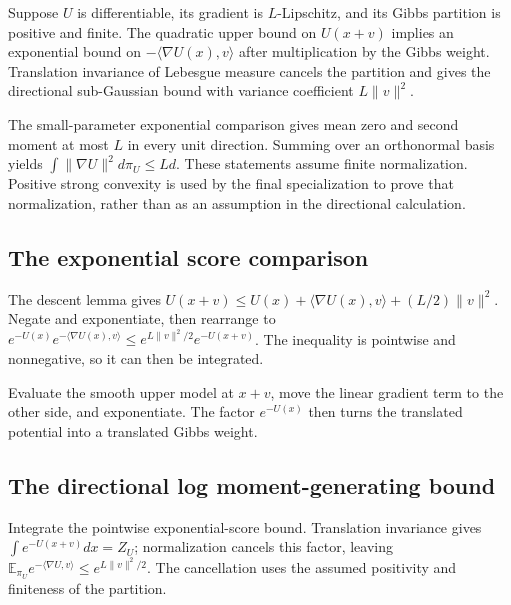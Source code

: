 \documentclass[11pt,a4paper]{report}
\begin{document}
Suppose \(U\) is differentiable, its gradient is \(L\)-Lipschitz, and its Gibbs partition is positive and finite. The quadratic upper bound on \(U(x+v)\) implies an exponential bound on \(-\langle\nabla U(x),v\rangle\) after multiplication by the Gibbs weight. Translation invariance of Lebesgue measure cancels the partition and gives the directional sub-Gaussian bound with variance coefficient \(L\|v\|^2\).



The small-parameter exponential comparison gives mean zero and second moment at most \(L\) in every unit direction. Summing over an orthonormal basis yields \(\int\|\nabla U\|^2d\pi_U\le Ld\). These statements assume finite normalization. Positive strong convexity is used by the final specialization to prove that normalization, rather than as an assumption in the directional calculation.

\subsection{\texorpdfstring{The exponential score comparison}{The exponential score comparison}}
\label{report-step-UnadjustedLangevin-GibbsScore-lean-1}


The descent lemma gives \(U(x+v)\le U(x)+\langle\nabla U(x),v\rangle+(L/2)\|v\|^2\). Negate and exponentiate, then rearrange to \(e^{-U(x)}e^{-\langle\nabla U(x),v\rangle}\le e^{L\|v\|^2/2}e^{-U(x+v)}\). The inequality is pointwise and nonnegative, so it can then be integrated.



Evaluate the smooth upper model at \(x+v\), move the linear gradient term to the other side, and exponentiate. The factor \(e^{-U(x)}\) then turns the translated potential into a translated Gibbs weight.

\subsection{\texorpdfstring{The directional log moment-generating bound}{The directional log moment-generating bound}}
\label{report-step-UnadjustedLangevin-GibbsScore-lean-2}


Integrate the pointwise exponential-score bound. Translation invariance gives \(\int e^{-U(x+v)}dx=Z_U\); normalization cancels this factor, leaving \(\mathbb E_{\pi_U}e^{-\langle\nabla U,v\rangle}\le e^{L\|v\|^2/2}\). The cancellation uses the assumed positivity and finiteness of the partition.
\end{document}
